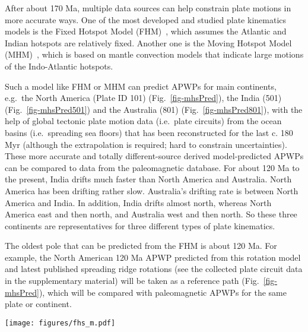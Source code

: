 After about 170 Ma, multiple data sources can help constrain plate motions in
more accurate ways. One of the most developed and studied plate kinematics
models is the Fixed Hotspot Model (FHM)~\cite{M93,M99}, which assumes the
Atlantic and Indian hotspots are relatively fixed. Another one is the Moving
Hotspot Model (MHM)~\cite{O05}, which is based on mantle convection models that
indicate large motions of the Indo-Atlantic hotspots.

Such a model like FHM or MHM can predict APWPs for main continents, e.g.\ the
North America (Plate ID 101) (Fig.~\ref{fig-mhsPred}), the India (501)
(Fig.~\ref{fig-mhsPred501}) and the Australia (801) (Fig.~\ref{fig-mhsPred801}),
with the help of global tectonic plate motion
data (i.e.\ plate circuits) from the ocean basins (i.e.\ spreading sea floors)
that has been reconstructed for the last c. 180 Myr (although the
extrapolation is required; hard to constrain uncertainties). These more accurate
and totally different-source derived model-predicted APWPs can be compared to
data from the paleomagnetic database. For about 120 Ma to the present, India
drifts much faster than North America and Australia. North America has been
drifting rather slow. Australia's drifting rate is between North America and
India. In addition, India drifts almost north, whereas North America east and
then north, and Australia west and then north. So these three continents are
representatives for three different types of plate kinematics.

The oldest pole that can be predicted from the FHM is about 120 Ma. For example,
the North American 120 Ma APWP predicted from this rotation model
and latest published spreading ridge rotations (see the collected plate circuit
data in the supplementary material) will be taken as a reference path
(Fig.~\ref{fig-mhsPred}), which will be compared with paleomagnetic APWPs for
the same plate or continent.

\begin{figure*}
\centering
\texttt{[image: figures/fhs\_m.pdf]}
\caption[120 Ma MHM vs FHM predicted APWP of North America]{MHM
predicted 120 Ma APWP (solid line) for $NAC$ through the North
America\textendash{}Nubia\textendash{}Mantle plate circuit. The FHM predicted
path (dashed line with shaded uncertainties) is also shown for comparison. The
age step is 5 Myr. Compared with the 10 Ma paleomagnetic mean pole calculated by
the AMP method (dark triangle), the coeval mean pole derived from the APP method
is closer to both FHM and MHM predicted 10 Ma poles, which indicates more data
diluting the effect of outliers. See also the paleopoles that the two mean poles
are composed of in Fig.~\ref{fig-nac-maplat}.}\label{fig-mhsPred}
\end{figure*}


